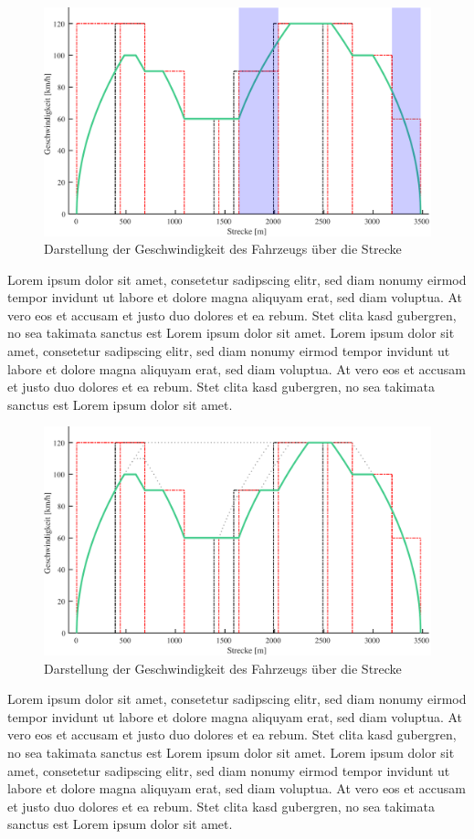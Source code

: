 \begin{figure}[H]
  \includegraphics[width=\linewidth]{../matlab/it_3.pdf}
  \caption{Darstellung der Geschwindigkeit des Fahrzeugs über die Strecke}
\end{figure}
Lorem ipsum dolor sit amet, consetetur sadipscing elitr, sed diam nonumy eirmod tempor invidunt ut labore et dolore magna aliquyam erat, sed diam voluptua. At vero eos et accusam et justo duo dolores et ea rebum. Stet clita kasd gubergren, no sea takimata sanctus est Lorem ipsum dolor sit amet. Lorem ipsum dolor sit amet, consetetur sadipscing elitr, sed diam nonumy eirmod tempor invidunt ut labore et dolore magna aliquyam erat, sed diam voluptua. At vero eos et accusam et justo duo dolores et ea rebum. Stet clita kasd gubergren, no sea takimata sanctus est Lorem ipsum dolor sit amet.
\begin{figure}[H]
  \includegraphics[width=\linewidth]{../matlab/it_4.pdf}
  \caption{Darstellung der Geschwindigkeit des Fahrzeugs über die Strecke}
\end{figure}
Lorem ipsum dolor sit amet, consetetur sadipscing elitr, sed diam nonumy eirmod tempor invidunt ut labore et dolore magna aliquyam erat, sed diam voluptua. At vero eos et accusam et justo duo dolores et ea rebum. Stet clita kasd gubergren, no sea takimata sanctus est Lorem ipsum dolor sit amet. Lorem ipsum dolor sit amet, consetetur sadipscing elitr, sed diam nonumy eirmod tempor invidunt ut labore et dolore magna aliquyam erat, sed diam voluptua. At vero eos et accusam et justo duo dolores et ea rebum. Stet clita kasd gubergren, no sea takimata sanctus est Lorem ipsum dolor sit amet.
